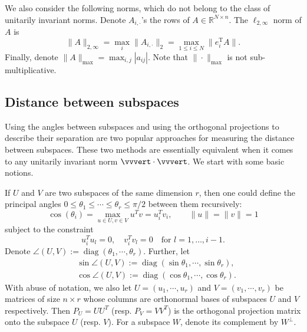 \documentclass[reqno]{amsart}
\DeclareMathOperator{\diag}{diag}
\newcommand{\T}{\mathrm{T}}
\theoremstyle{plain}
\theoremstyle{definition}
\begin{document}
We also consider the following norms, which do not belong to the class of unitarily invariant norms. Denote $A_{i,\cdot}$'s the rows of $A \in \mathbb{R}^{N \times n}$. %
The $\ell_{2,\infty}$ norm of $A$ is $$\|A\|_{2,\infty} =\max_{i} \|A_{i,\cdot}\|_2=\max_{1\le i\le N} \|e_i^\T A\|.$$ Finally, denote $\|A\|_{\max} = \max_{i,j} |a_{ij}|$. Note that $\|\cdot \|_{\max}$ is not 
sub-multiplicative.

\subsection{Distance between subspaces}\label{sec:distance} Using the angles between subspaces and using the orthogonal projections to describe their separation are two popular approaches for measuring the distance between subspaces. These two methods are essentially equivalent when it comes to any unitarily invariant norm $\vvvert \cdot \vvvert$. We start with some basic notions. 

If $U$ and $V$ are two subspaces of the same dimension $r$, then one could define the principal angles $0\le \theta_1\le \cdots \le \theta_r\le {\pi}/{2}$  between them recursively: 
\begin{equation*}
\cos (\theta_i) = \max_{u\in U, v\in V} u^T v =u_i^T v_i, \qquad \|u\|=\|v\|=1
\end{equation*}
subject to the constraint
$$ u_i^T u_l=0, \quad v_i^T v_l =0\quad \text{for } l=1,\ldots,i-1.$$
Denote  $\angle (U,V) := \diag(\theta_1, \cdots , \theta_r)$. Further, let 
\begin{align*}
&\sin\angle (U,V)  := \diag(\sin\theta_1, \cdots , \sin\theta_r),\\
&\cos\angle (U,V)  := \diag(\cos\theta_1, \cdots , \cos\theta_r).
\end{align*}
With abuse of notation, we also let $U=(u_1,\cdots,u_r)$ and $V=(v_1,\cdots,v_r)$ be matrices of size $n\times r$ whose columns are orthonormal bases of subspaces $U$ and $V$ respectively. Then $P_U=U U^T$ (resp. $P_V = V V^T$) is the orthogonal projection matrix onto the subspace $U$ (resp. $V$). For a subspace $W$, denote its complement by $W^\perp$.
\end{document}
